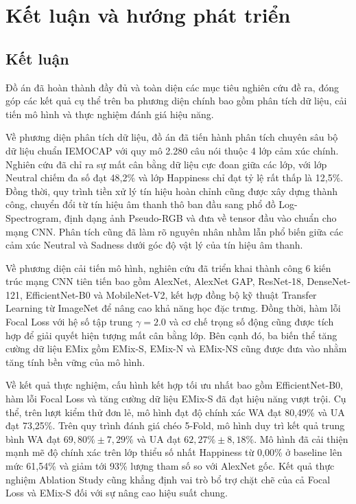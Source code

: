 \chapter{Kết luận và hướng phát triển}
\label{chap:conclusion}

\section{Kết luận}
\label{sec:conclusion}

Đồ án đã hoàn thành đầy đủ và toàn diện các mục tiêu nghiên cứu đề ra, đóng góp các kết quả cụ thể trên ba phương diện chính bao gồm phân tích dữ liệu, cải tiến mô hình và thực nghiệm đánh giá hiệu năng.

Về phương diện phân tích dữ liệu, đồ án đã tiến hành phân tích chuyên sâu bộ dữ liệu chuẩn IEMOCAP với quy mô 2.280 câu nói thuộc 4 lớp cảm xúc chính. Nghiên cứu đã chỉ ra sự mất cân bằng dữ liệu cực đoan giữa các lớp, với lớp Neutral chiếm đa số đạt 48,2\% và lớp Happiness chỉ đạt tỷ lệ rất thấp là 12,5\%. Đồng thời, quy trình tiền xử lý tín hiệu hoàn chỉnh cũng được xây dựng thành công, chuyển đổi từ tín hiệu âm thanh thô ban đầu sang phổ đồ Log-Spectrogram, định dạng ảnh Pseudo-RGB và đưa về tensor đầu vào chuẩn cho mạng CNN. Phân tích cũng đã làm rõ nguyên nhân nhầm lẫn phổ biến giữa các cảm xúc Neutral và Sadness dưới góc độ vật lý của tín hiệu âm thanh.

Về phương diện cải tiến mô hình, nghiên cứu đã triển khai thành công 6 kiến trúc mạng CNN tiên tiến bao gồm AlexNet, AlexNet GAP, ResNet-18, DenseNet-121, EfficientNet-B0 và MobileNet-V2, kết hợp đồng bộ kỹ thuật Transfer Learning từ ImageNet để nâng cao khả năng học đặc trưng. Đồng thời, hàm lỗi Focal Loss với hệ số tập trung $\gamma = 2.0$ và cơ chế trọng số động cũng được tích hợp để giải quyết hiện tượng mất cân bằng lớp. Bên cạnh đó, ba biến thể tăng cường dữ liệu EMix gồm EMix-S, EMix-N và EMix-NS cũng được đưa vào nhằm tăng tính bền vững của mô hình.

Về kết quả thực nghiệm, cấu hình kết hợp tối ưu nhất bao gồm EfficientNet-B0, hàm lỗi Focal Loss và tăng cường dữ liệu EMix-S đã đạt hiệu năng vượt trội. Cụ thể, trên lượt kiểm thử đơn lẻ, mô hình đạt độ chính xác WA đạt 80,49\% và UA đạt 73,25\%. Trên quy trình đánh giá chéo 5-Fold, mô hình duy trì kết quả trung bình WA đạt $69,80\% \pm 7,29\%$ và UA đạt $62,27\% \pm 8,18\%$. Mô hình đã cải thiện mạnh mẽ độ chính xác trên lớp thiểu số nhất Happiness từ 0,00\% ở baseline lên mức 61,54\% và giảm tới 93\% lượng tham số so với AlexNet gốc. Kết quả thực nghiệm Ablation Study cũng khẳng định vai trò bổ trợ chặt chẽ của cả Focal Loss và EMix-S đối với sự nâng cao hiệu suất chung.

